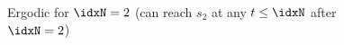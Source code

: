 \begin{examplebox}\nospacing
  \begin{example}\label{example:defn:ergodic_markov_chain}\leavevmode\\
    \begin{figure}[H]
      \centering{
        \def\svgwidth{100pt}
        \vspace{-1em}
        \resizebox{0.5\linewidth}{!}{}
      }
      \caption{Ergodic for $\idxN=2$ (can reach $s_{2}$ at any $t\leq \idxN$ after $\idxN=2$)}
    \end{figure}
  \end{example}
\end{examplebox}
